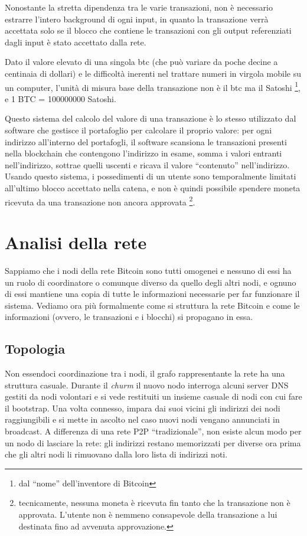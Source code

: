 Nonostante la stretta dipendenza tra le varie transazioni, non è necessario estrarre l'intero background di ogni input, in quanto la transazione verrà accettata solo se il blocco che contiene le transazioni con gli output referenziati dagli input è stato accettato dalla rete.

Dato il valore elevato di una singola btc (che può variare da poche decine a centinaia di dollari) e le difficoltà inerenti nel trattare numeri in virgola mobile su un computer, l'unità di misura base della transazione non è il btc ma il Satoshi \footnote{dal ``nome''   dell'inventore di Bitcoin}, e 1 BTC = 100000000 Satoshi.

Questo sistema del calcolo del valore di una transazione è lo stesso utilizzato dal software che gestisce il portafoglio per calcolare il proprio valore: per ogni indirizzo all'interno del portafogli, il software scansiona le transazioni presenti nella blockchain che contengono l'indirizzo in esame, somma i valori entranti nell'indirizzo, sottrae quelli uscenti e ricava il valore ``contenuto'' nell'indirizzo. Usando questo sistema, i possedimenti di un utente sono temporalmente limitati all'ultimo blocco accettato nella catena, e non è quindi possibile spendere moneta ricevuta da una transazione non ancora approvata \footnote{tecnicamente, nessuna moneta è ricevuta fin tanto   che la transazione non è approvata. L'utente non è nemmeno consapevole   della transazione a lui destinata fino ad avvenuta approvazione.}.

\section{Analisi della rete}\label{analisi-della-rete}

Sappiamo che i nodi della rete Bitcoin sono tutti omogenei e nessuno di essi ha un ruolo di coordinatore o comunque diverso da quello degli altri nodi, e ognuno di essi mantiene una copia di tutte le informazioni necessarie per far funzionare il sistema. Vediamo ora più formalmente come si struttura la rete Bitcoin e come le informazioni (ovvero, le transazioni e i blocchi) si propagano in essa.

\subsection{Topologia}\label{topologia}

Non essendoci coordinazione tra i nodi, il grafo rappresentante la rete ha una struttura casuale. Durante il \emph{churm} il nuovo nodo interroga alcuni server DNS gestiti da nodi volontari e si vede restituiti un insieme casuale di nodi con cui fare il bootstrap. Una volta connesso, impara dai suoi vicini gli indirizzi dei nodi raggiungibili e si mette in ascolto nel caso nuovi nodi vengano annunciati in broadcast. A differenza di una rete P2P ``tradizionale'', non esiste alcun modo per un nodo di lasciare la rete: gli indirizzi restano memorizzati per diverse ora prima che gli altri nodi li rimuovano dalla loro lista di indirizzi noti.

